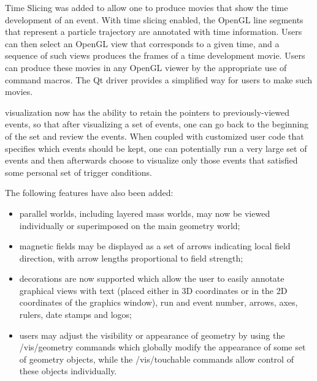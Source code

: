 
Time Slicing was added to allow one to produce movies that show the time
development of an event.  With time slicing enabled, the OpenGL line segments
that represent a particle trajectory are annotated with time information.  Users
can then select an OpenGL view that corresponds to a given time, and a sequence
of such views produces the frames of a time development movie.  Users can 
produce these movies in any OpenGL viewer by the appropriate use of \Gfour{}
command macros.  The Qt driver provides a simplified way for users to make such
movies.

\Gfour{} visualization now has the ability to retain the pointers to 
previously-viewed events, so that after visualizing a set of events, one can go
back to the beginning of the set and review the events.  When coupled with 
customized user code that specifies which events should be kept, one can 
potentially run a very large set of events and then afterwards choose to 
visualize only those events that satisfied some personal set of trigger 
conditions.

The following features have also been added:
\begin{itemize}
\item parallel worlds, including layered mass worlds, may now be viewed
      individually or superimposed on the main geometry world;

\item magnetic fields may be displayed as a set of arrows indicating local
      field direction, with arrow lengths proportional to field strength;

\item decorations are now supported which allow the user to easily annotate
      graphical views with text (placed either in 3D coordinates or 
      in the 2D coordinates of the graphics window), run and event number,
      arrows, axes, rulers, date stamps and logos;

\item users may adjust the visibility or appearance of geometry by using the 
      /vis/geometry commands which globally modify the appearance of some set of
      geometry objects, while the /vis/touchable commands allow control of these
      objects individually.
\end{itemize}

